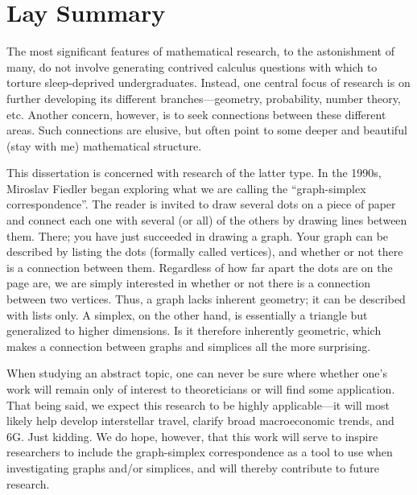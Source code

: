 \chapter*{Lay Summary}

The  most  significant features of mathematical research, to the astonishment of  many, do not involve generating contrived  calculus  questions with which to torture sleep-deprived undergraduates. 
Instead, one central focus of research is  on further developing  its different branches---geometry, probability, number theory, etc.  Another concern, however, is to seek connections between these different areas. Such  connections are elusive, but often point to some deeper and beautiful (stay with me) mathematical structure. 

This dissertation is concerned with research of the latter type. In  the 1990s, Miroslav Fiedler began exploring what we are calling the ``graph-simplex correspondence''. 
The  reader is invited  to draw several dots  on a piece of paper and connect each one with  several (or all) of the others by drawing  lines between them. There; you have  just succeeded in drawing a graph. Your graph can be  described  by listing the dots (formally  called vertices), and whether or not there is a  connection between  them. Regardless of how far  apart the dots  are on the page are, we are  simply interested in whether or not there is a  connection between two vertices. Thus, a graph  lacks inherent  geometry; it  can  be described with  lists only. A simplex, on the other  hand, is essentially a triangle but generalized  to higher dimensions. Is it therefore inherently geometric, which makes a connection between graphs and simplices all the more surprising. 

When studying an abstract topic, one can never be  sure where whether one's work will remain only of interest to theoreticians or will find some application. That being said, we expect this research to be highly applicable---it will most likely help develop interstellar travel, clarify broad macroeconomic trends, and 6G. Just kidding. We do hope, however, that this work will serve to inspire researchers to include the  graph-simplex correspondence as a tool to use when  investigating graphs and/or simplices, and will thereby contribute to future  research. 
 

